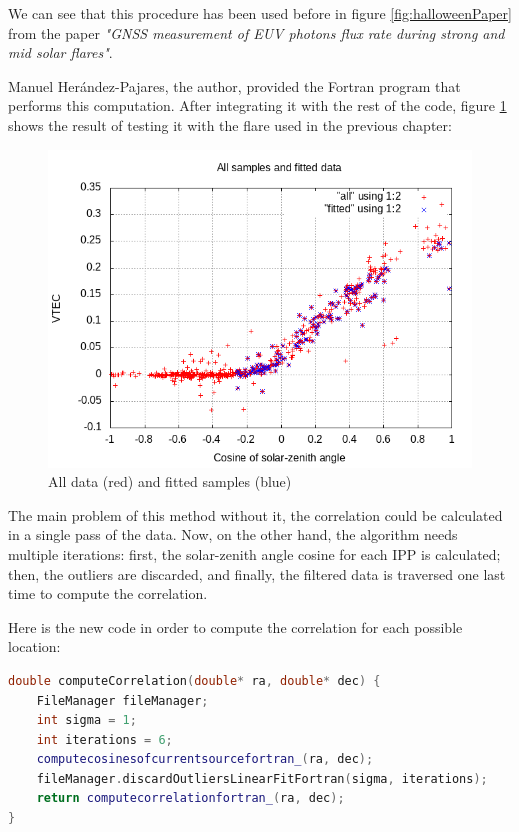 We can see that this procedure has been used before in figure \ref{fig:halloweenPaper} from the paper \textit{"GNSS measurement of EUV photons flux rate during strong and mid solar flares"}\cite{hernandez2012gnss}.

Manuel Herández-Pajares, the author, provided the Fortran program that performs this computation. After integrating it with the rest of the code, figure \ref{fig:linearFit} shows the result of testing it with the flare used in the previous chapter:

\begin{figure}[!htb]
	\begin{centering}
	\includegraphics[width=0.5\linewidth]{images/ch6/linearFit/resultAll.png}
		\caption{All data (red) and fitted samples (blue)}
		\label{fig:linearFit}
	\end{centering}
\end{figure}

The main problem of this method without it, the correlation could be calculated in a single pass of the data. Now, on the other hand, the algorithm needs multiple iterations: first, the solar-zenith angle cosine for each IPP is calculated; then, the outliers are discarded, and finally, the filtered data is traversed one last time to compute the correlation.

Here is the new code in order to compute the correlation for each possible location:

\begin{minipage}{\linewidth}
\begin{lstlisting}[language=C++, caption=Discarding outliers and computing the correlation]
double computeCorrelation(double* ra, double* dec) {
	FileManager fileManager;
	int sigma = 1;
	int iterations = 6;
	computecosinesofcurrentsourcefortran_(ra, dec);
	fileManager.discardOutliersLinearFitFortran(sigma, iterations);
	return computecorrelationfortran_(ra, dec);
}\end{lstlisting}
\end{minipage}

